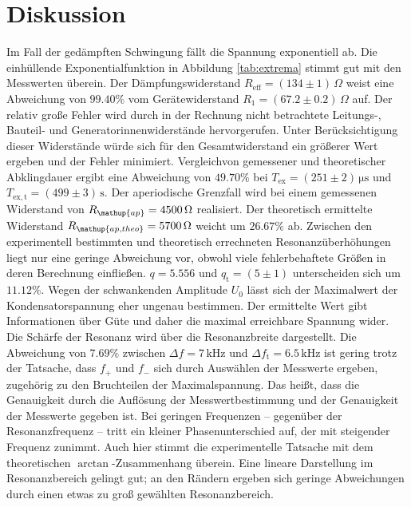 \section{Diskussion}
\label{sec:Diskussion}

Im Fall der gedämpften Schwingung fällt die Spannung exponentiell ab. Die einhüllende Exponentialfunktion in Abbildung \ref{tab:extrema} stimmt gut mit den Messwerten überein. Der Dämpfungswiderstand $R_\mathup{eff}=(134\pm1)\,\si{\Omega}$ weist eine Abweichung von $99.40\%$ vom Gerätewiderstand $R_1=(67.2\pm0.2)\,\si{\Omega}$ auf. Der relativ große Fehler wird durch in der Rechnung nicht betrachtete Leitungs-, Bauteil- und Generatorinnenwiderstände hervorgerufen. Unter Berücksichtigung dieser Widerstände würde sich für den Gesamtwiderstand ein größerer Wert ergeben und der Fehler minimiert.
Vergleichvon gemessener und theoretischer Abklingdauer ergibt eine Abweichung von $49.70\%$ bei $T_\mathup{ex}=(251\pm2)\,\si{\micro\second}$ und $T_\mathup{ex,t}=(499\pm3)\,\si\second$. 
Der aperiodische Grenzfall wird bei einem gemessenen Widerstand von $R_\mathup{ap}=4500\,\si\Omega$ realisiert. Der theoretisch ermittelte Widerstand $R_\mathup{ap,theo}=5700\,\si\Omega$ weicht um $26.67\%$ ab.
Zwischen den experimentell bestimmten und theoretisch errechneten Resonanzüberhöhungen liegt nur eine geringe Abweichung vor, obwohl viele fehlerbehaftete Größen in deren Berechnung einfließen. $q=5.556$ und $q_\mathup{t}=(5\pm1)$ unterscheiden sich um $11.12\%$.
Wegen der schwankenden Amplitude $U_0$ lässt sich der Maximalwert der Kondensatorspannung eher ungenau bestimmen. Der ermittelte Wert gibt Informationen über Güte und daher die maximal erreichbare Spannung wider.
Die Schärfe der Resonanz wird über die Resonanzbreite dargestellt. Die Abweichung von $7.69\%$ zwischen $\Delta{f}=7\,\si{\kilo\hertz}$ und $\Delta{f_\mathup{t}}=6.5\,\si{\kilo\hertz}$ 
ist gering trotz der Tatsache, dass $f_+$ und $f_-$ sich durch Auswählen der Messwerte ergeben, zugehörig zu den Bruchteilen der Maximalspannung. Das heißt, dass die Genauigkeit durch die Auflösung der Messwertbestimmung und der Genauigkeit der Messwerte gegeben ist.
Bei geringen Frequenzen -- gegenüber der Resonanzfrequenz -- tritt ein kleiner Phasenunterschied auf, der mit steigender Frequenz zunimmt. Auch hier stimmt die experimentelle Tatsache mit dem theoretischen $\arctan$-Zusammenhang überein. 
Eine lineare Darstellung im Resonanzbereich gelingt gut; an den Rändern ergeben sich geringe Abweichungen durch einen etwas zu groß gewählten Resonanzbereich.

